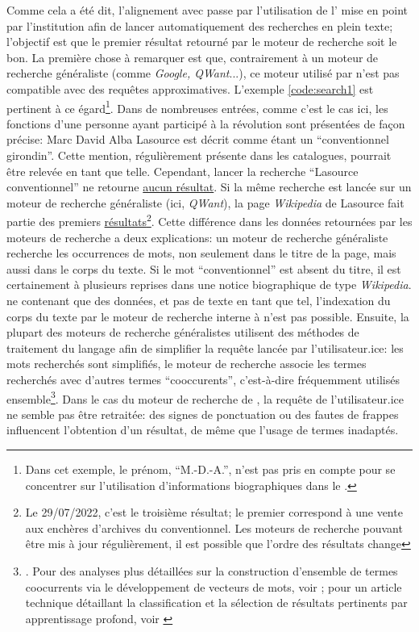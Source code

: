 Comme cela a été dit, l'alignement avec \wkd{} passe par l'utilisation de l'\api{} mise en point par l'institution afin de lancer automatiquement des recherches en plein texte; l'objectif est que le premier résultat retourné par le moteur de recherche soit le bon. La première chose à remarquer est que, contrairement à un moteur de recherche généraliste (comme \textit{Google, QWant}...), ce moteur utilisé par \wkd{} n'est pas compatible avec des requêtes approximatives. L'exemple \ref{code:search1} est pertinent à ce égard\footnote{Dans cet exemple, le prénom, \enquote{M.-D.-A.}, n'est pas pris en compte pour se concentrer sur l'utilisation d'informations biographiques dans le \ttrait{}.}. Dans de nombreuses entrées, comme c'est le cas ici, les fonctions d'une personne ayant participé à la révolution sont présentées de façon précise: Marc David Alba Lasource est décrit comme étant un \enquote{conventionnel girondin}. Cette mention, régulièrement présente dans les catalogues, pourrait être relevée en tant que telle. Cependant, lancer la recherche \enquote{Lasource conventionnel} ne retourne \href{https://www.wikidata.org/w/index.php?search=lasource+conventionnel&title=Special:Search&profile=advanced&fulltext=1&ns0=1&ns120=1}{aucun résultat}. Si la même recherche est lancée sur un moteur de recherche généraliste (ici, \textit{QWant}), la page \textit{Wikipedia} de Lasource fait partie des premiers \href{https://www.qwant.com/?q=lasource+conventionnel}{résultats}\footnote{Le 29/07/2022, c'est le troisième résultat; le premier correspond à une vente aux enchères d'archives du conventionnel. Les moteurs de recherche pouvant être mis à jour régulièrement, il est possible que l'ordre des résultats change}. Cette différence dans les données retournées par les moteurs de recherche a deux explications: un moteur de recherche généraliste recherche les occurrences de mots, non seulement dans le titre de la page, mais aussi dans le corps du texte. Si le mot \enquote{conventionnel} est absent du titre, il est certainement à plusieurs reprises dans une notice biographique de type \textit{Wikipedia}. \wkd{} ne contenant que des données, et pas de texte en tant que tel, l'indexation du corps du texte par le moteur de recherche interne à \wkd{} n'est pas possible. Ensuite, la plupart des moteurs de recherche généralistes utilisent des méthodes de traitement du langage afin de simplifier la requête lancée par l'utilisateur.ice: les mots recherchés sont simplifiés, le moteur de recherche associe les termes recherchés avec d'autres termes \enquote{cooccurents}, c'est-à-dire fréquemment utilisés ensemble\footnote{\cite{noauthor_moteur_2022}. Pour des analyses plus détaillées sur la construction d'ensemble de termes coocurrents via le développement de vecteurs de mots, voir \cite{mikolov_efficient_2013}; pour un article technique détaillant la classification et la sélection de résultats pertinents par apprentissage profond, voir \cite{covington_deep_2016}}. Dans le cas du moteur de recherche de \wkd{}, la requête de l'utilisateur.ice ne semble pas être retraitée: des signes de ponctuation ou des fautes de frappes influencent l'obtention d'un résultat, de même que l'usage de termes inadaptés.

